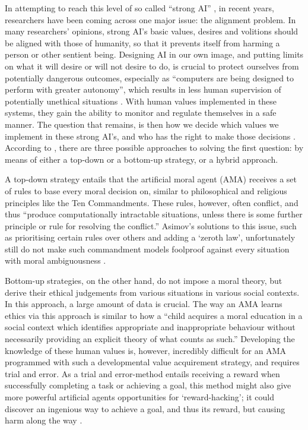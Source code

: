 \documentclass[final]{clv3} %
\begin{document}
In attempting to reach this level of so called “strong AI” \cite{chineseroom}, in recent years, researchers have been coming across one major issue: the alignment problem. In many researchers’ opinions, strong AI’s basic values, desires and volitions should be aligned with those of humanity, so that it prevents itself from harming a person or other sentient being. Designing AI in our own image, and putting limits on what it will desire or will not desire to do, is crucial to protect ourselves from potentially dangerous outcomes, especially as “computers are being designed to perform with greater autonomy”, which results in less human supervision of potentially unethical situations \cite[p. 149]{allen2005}. With human values implemented in these systems, they gain the ability to monitor and regulate themselves in a safe manner. The question that remains, is then how we decide which values we implement in these strong AI’s, and who has the right to make those decisions \cite{gabriel}. According to \citet{allen2005}, there are three possible approaches to solving the first question: by means of either a top-down or a bottom-up strategy, or a hybrid approach. 

A top-down strategy entails that the artificial moral agent (AMA) receives a set of rules to base every moral decision on, similar to philosophical and religious principles like the Ten Commandments. These rules, however, often conflict, and thus “produce computationally intractable situations, unless there is some further principle or rule for resolving the conflict.” \cite[p. 149]{allen2005} Asimov’s solutions to this issue, such as prioritising certain rules over others and adding a ‘zeroth law’, unfortunately still do not make such commandment models foolproof against every situation with moral ambiguousness \cite{allen2005}.

Bottom-up strategies, on the other hand, do not impose a moral theory, but derive their ethical judgements from various situations in various social contexts. In this approach, a large amount of data is crucial. The way an AMA learns ethics via this approach is similar to how a “child acquires a moral education in a social context which identifies appropriate and inappropriate behaviour without necessarily providing an explicit theory of what counts as such.” \cite[p. 151]{allen2005} Developing the knowledge of these human values is, however, incredibly difficult for an AMA programmed with such a developmental value acquirement strategy, and requires trial and error. As a trial and error-method entails receiving a reward when successfully completing a task or achieving a goal, this method might also give more powerful artificial agents opportunities for ‘reward-hacking’; it could discover an ingenious way to achieve a goal, and thus its reward, but causing harm along the way \cite{gabriel}. \\
\end{document}
